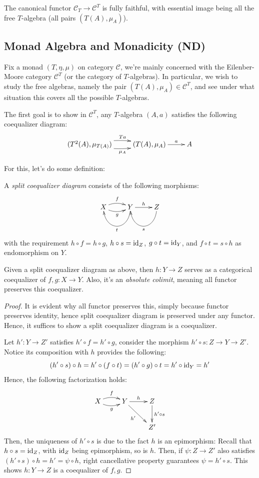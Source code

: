 \documentclass{article}
\begin{document}
\begin{lem}
    The canonical functor $\mathcal{C}_T\rightarrow\mathcal{C}^T$ is fully faithful, with essential image being all the free $T$-algebra (all pairs $(T(A),\mu_A)$).
\end{lem}

\newpage

\subsection{Monad Algebra and Monadicity (ND)}

Fix a monad $(T,\eta,\mu)$ on category $\mathcal{C}$, we're mainly concerned with the Eilenber-Moore category $\mathcal{C}^T$ (or the category of $T$-algebras). In particular, we wish to study the free algebras, namely the pair $(T(A),\mu_A)\in \mathcal{C}^T$, and see under what situation this covers all the possible $T$-algebras.

The first goal is to show in $\mathcal{C}^T$, any $T$-algebra $(A,a)$ satisfies the following coequalizer diagram:
\[\xymatrix{
    (T^2(A),\mu_{T(A)}) \ar@/_{-.5pc}/[r]^-{Ta} \ar@/_{.5pc}/[r]_-{\mu_A} & (T(A),\mu_A) \ar[r]^-{a} & A
}\]

For this, let's do some definition:
\begin{defn}
    A \emph{split coequalizer diagram} consists of the following morphisms:
    \[\xymatrix{
        X \ar@/_{-.5pc}/[r]^-{f} \ar@/_{.5pc}/[r]_-{g} & Y \ar@(d,d)[l]^-{t} \ar[r]^-{h} & Z \ar@(d,d)[l]^-{s}
    }\]
    with the requirement $h\circ f=h\circ g$, $h\circ s=\mathrm{id}_Z$, $g\circ t = \mathrm{id}_Y$, and $f\circ t=s\circ h$ as endomorphism on $Y$.
\end{defn}

\begin{lem}
    Given a split coequalizer diagram as above, then $h:Y\rightarrow Z$ serves as a categorical coequalizer of $f,g:X\rightarrow Y$. Also, it's an \emph{absolute colimit}, meaning all functor preserves this coequalizer.
\end{lem}
\begin{proof}
    It is evident why all functor preserves this, simply because functor preserves identity, hence split coequalizer diagram is preserved under any functor. Hence, it suffices to show a split coequalizer diagram is a coequalizer.

    Let $h':Y\rightarrow Z'$ satisfies $h'\circ f=h'\circ g$, consider the morphism $h'\circ s:Z\rightarrow Y\rightarrow Z'$. Notice its composition with $h$ provides the following:
    \[(h'\circ s)\circ h = h'\circ (f\circ t) = (h'\circ g)\circ t = h'\circ \mathrm{id}_{Y} = h'\]
    Hence, the following factorization holds:
    \[\xymatrix{
        X \ar@/_{-.5pc}/[r]^-{f} \ar@/_{.5pc}/[r]_-{g} & Y\ar[r]^-{h} \ar[dr]_-{h'} & Z \ar[d]^-{h'\circ s}\\
        && Z'
    }\]
    Then, the uniqueness of $h'\circ s$ is due to the fact $h$ is an epimorphism: Recall that $h\circ s=\mathrm{id}_Z$, with $\mathrm{id}_Z$ being epimorphism, so is $h$. Then, if $\psi:Z\rightarrow Z'$ also satisfies $(h'\circ s)\circ h=h' = \psi\circ h$, right cancellative property guarantees $\psi=h'\circ s$. This shows $h:Y\rightarrow Z$ is a coequalizer of $f,g$.
\end{proof}
\end{document}
